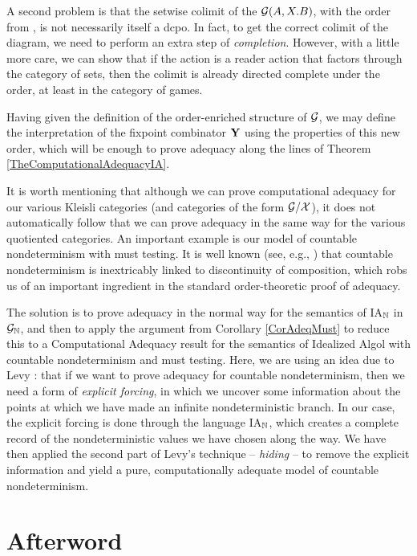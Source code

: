 A second problem is that the setwise colimit of the $\mathcal G(A,X.B)$, with the order from \cite{Fiech}, is not necessarily itself a dcpo.  
In fact, to get the correct colimit of the diagram, we need to perform an extra step of \emph{completion}.  
However, with a little more care, we can show that if the action is a reader action that factors through the category of sets, then the colimit is already directed complete under the order, at least in the category of games.

Having given the definition of the order-enriched structure of $\mathcal G$, we may define the interpretation of the fixpoint combinator $\mathbf{Y}$ using the properties of this new order, which will be enough to prove adequacy along the lines of Theorem \ref{TheComputationalAdequacyIA}.

It is worth mentioning that although we can prove computational adequacy for our various Kleisli categories (and categories of the form $\mathcal G/\mathcal X$), it does not automatically follow that we can prove adequacy in the same way for the various quotiented categories.  
An important example is our model of countable nondeterminism with must testing.  
It is well known (see, e.g., \cite{Apt,PlotkinApt}) that countable nondeterminism is inextricably linked to discontinuity of composition, which robs us of an important ingredient in the standard order-theoretic proof of adequacy.

The solution is to prove adequacy in the normal way for the semantics of IA${}_{\mathbb{N}}$ in $\mathcal G_{\mathbb{N}}$, and then to apply the argument from Corollary \ref{CorAdeqMust} to reduce this to a Computational Adequacy result for the semantics of Idealized Algol with countable nondeterminism and must testing.
Here, we are using an idea due to Levy \cite{LevyGsInfinite}: that if we want to prove adequacy for countable nondeterminism, then we need a form of \emph{explicit forcing}, in which we uncover some information about the points at which we have made an infinite nondeterministic branch.  
In our case, the explicit forcing is done through the language IA${}_{\mathbb{N}}$, which creates a complete record of the nondeterministic values we have chosen along the way.  
We have then applied the second part of Levy's technique -- \emph{hiding} -- to remove the explicit information and yield a pure, computationally adequate model of countable nondeterminism.

\section{Afterword}

